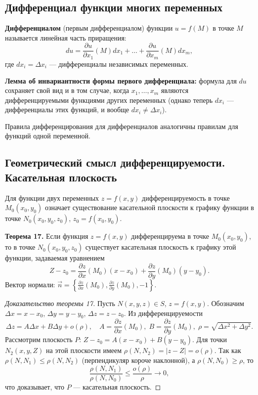 \documentclass{article}
\theoremstyle{definition}
\begin{document}
\subsection{Дифференциал функции многих переменных}
\textbf{Дифференциалом} (первым дифференциалом) функции $u=f(M)$ в точке $M$ называется линейная часть приращения:
\[
du = \frac{\partial u}{\partial x_1}(M)dx_1+\dots+\frac{\partial u}{\partial x_m}(M)dx_m,
\]
где $dx_i=\Delta x_i$ — дифференциалы независимых переменных.

\textbf{Лемма об инвариантности формы первого дифференциала:} формула для $du$ сохраняет свой вид и в том случае, когда $x_1,\dots,x_m$ являются дифференцируемыми функциями других переменных (однако теперь $dx_i$ — дифференциалы этих функций, и вообще $dx_i\neq\Delta x_i$).

Правила дифференцирования для дифференциалов аналогичны правилам для функций одной переменной.

\subsection{Геометрический смысл дифференцируемости. Касательная плоскость}
Для функции двух переменных $z=f(x,y)$ дифференцируемость в точке $M_0(x_0,y_0)$ означает существование касательной плоскости к графику функции в точке $N_0(x_0,y_0,z_0)$, $z_0=f(x_0,y_0)$.

\textbf{Теорема 17.} Если функция $z=f(x,y)$ дифференцируема в точке $M_0(x_0,y_0)$, то в точке $N_0(x_0,y_0,z_0)$ существует касательная плоскость к графику этой функции, задаваемая уравнением
\[
Z-z_0 = \frac{\partial z}{\partial x}(M_0)(x-x_0) + \frac{\partial z}{\partial y}(M_0)(y-y_0).
\]
Вектор нормали: $\vec{n}=\left\{\frac{\partial z}{\partial x}(M_0),\frac{\partial z}{\partial y}(M_0),-1\right\}$.

\begin{proof}[Доказательство теоремы 17]
Пусть $N(x,y,z)\in S$, $z=f(x,y)$. Обозначим $\Delta x=x-x_0$, $\Delta y=y-y_0$, $\Delta z=z-z_0$. Из дифференцируемости
\[
\Delta z = A\Delta x + B\Delta y + o(\rho),\quad A=\frac{\partial z}{\partial x}(M_0),\;B=\frac{\partial z}{\partial y}(M_0),\;\rho=\sqrt{\Delta x^2+\Delta y^2}.
\]
Рассмотрим плоскость $P$: $Z-z_0 = A(x-x_0)+B(y-y_0)$. Для точки $N_2(x,y,Z)$ на этой плоскости имеем $\rho(N,N_2)=|z-Z|=o(\rho)$. Так как $\rho(N,N_1)\le\rho(N,N_2)$ (перпендикуляр короче наклонной), а $\rho(N,N_0)\ge\rho$, то
\[
\frac{\rho(N,N_1)}{\rho(N,N_0)}\le\frac{o(\rho)}{\rho}\to0,
\]
что доказывает, что $P$ — касательная плоскость.
\end{proof}
\end{document}
